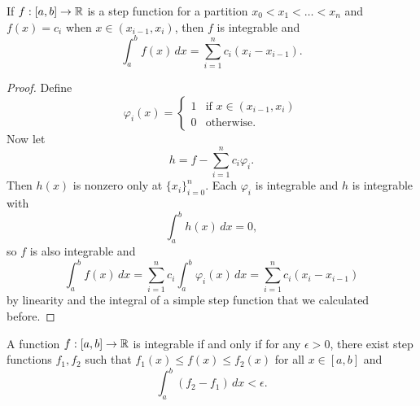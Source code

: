 \begin{lemma}
  If $f : [a, b] \to \mathbb{R}$ is a step function for
  a partition $x_0 < x_1 < \dots < x_n$ and
  $f(x) = c_i$ when $x \in (x_{i - 1}, x_i)$, then
  $f$ is integrable and
  \[
    \int_a^b f(x)\, dx = \sum_{i = 1}^n c_i (x_i - x_{i - 1}).
  \]
\end{lemma}

\begin{proof}
  Define
  \[
    \varphi_i(x) = \begin{cases}
      1 & \text{if } x \in (x_{i - 1}, x_i) \\
      0 & \text{otherwise}.
    \end{cases}
  \]
  Now let
  \[
    h = f - \sum_{i = 1}^n c_i \varphi_i.
  \]
  Then $h(x)$ is nonzero only at $\{x_i\}_{i = 0}^n$.
  Each $\varphi_i$ is integrable and $h$ is integrable
  with
  \[
    \int_a^b h(x)\, dx = 0,
  \]
  so $f$ is also integrable and
  \[
    \int_a^b f(x)\, dx
    = \sum_{i = 1}^{n} c_i \int_a^b \varphi_i(x)\, dx
    = \sum_{i = 1}^n c_i (x_i - x_{i - 1})
  \]
  by linearity and the integral of a simple
  step function that we calculated before.
\end{proof}

\begin{prop}
  A function $f : [a, b] \to \mathbb{R}$ is integrable if
  and only if for any $\epsilon > 0$, there exist
  step functions $f_1, f_2$ such that
  $f_1(x) \le f(x) \le f_2(x)$ for all $x \in [a, b]$
  and
  \[
    \int_a^b (f_2 - f_1)\, dx < \epsilon.
  \]
\end{prop}

